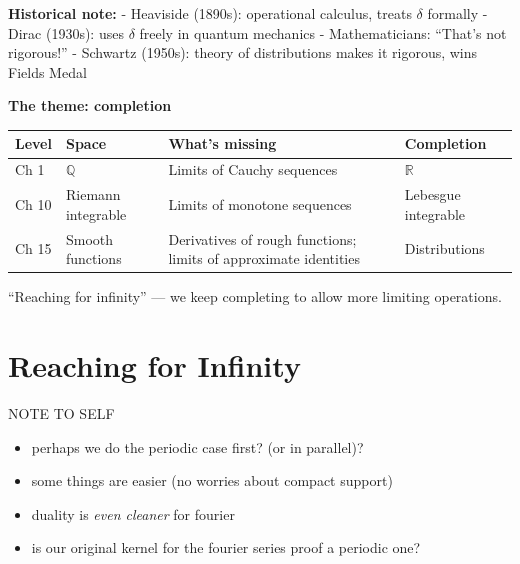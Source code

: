 \documentclass[
  10pt,
  letterpaper,
]{scrbook}
\providecommand{\tightlist}{%
  \setlength{\itemsep}{0pt}\setlength{\parskip}{0pt}}
\begin{document}
\textbf{Historical note:} - Heaviside (1890s): operational calculus,
treats \(\delta\) formally - Dirac (1930s): uses \(\delta\) freely in
quantum mechanics - Mathematicians: ``That's not rigorous!'' - Schwartz
(1950s): theory of distributions makes it rigorous, wins Fields Medal

\textbf{The theme: completion}

\begin{longtable}[]{@{}
  >{\raggedright\arraybackslash}p{}
  >{\raggedright\arraybackslash}p{}
  >{\raggedright\arraybackslash}p{}
  >{\raggedright\arraybackslash}p{}@{}}
\toprule\noalign{}
\begin{minipage}[b]{\linewidth}\raggedright
Level
\end{minipage} & \begin{minipage}[b]{\linewidth}\raggedright
Space
\end{minipage} & \begin{minipage}[b]{\linewidth}\raggedright
What's missing
\end{minipage} & \begin{minipage}[b]{\linewidth}\raggedright
Completion
\end{minipage} \\
\midrule\noalign{}
\endhead
\bottomrule\noalign{}
\endlastfoot
Ch 1 & \(\mathbb{Q}\) & Limits of Cauchy sequences & \(\mathbb{R}\) \\
Ch 10 & Riemann integrable & Limits of monotone sequences & Lebesgue
integrable \\
Ch 15 & Smooth functions & Derivatives of rough functions; limits of
approximate identities & Distributions \\
\end{longtable}

``Reaching for infinity'' --- we keep completing to allow more limiting
operations.

\section{Reaching for Infinity}\label{reaching-for-infinity}

NOTE TO SELF

\begin{itemize}
\tightlist
\item
  perhaps we do the periodic case first? (or in parallel)?
\item
  some things are easier (no worries about compact support)
\item
  duality is \emph{even cleaner} for fourier
\item
  is our original kernel for the fourier series proof a periodic one?
\end{itemize}
\end{document}
